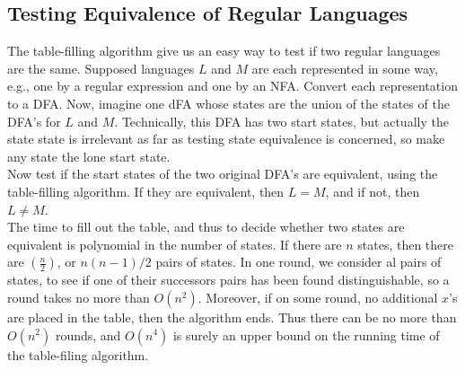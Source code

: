 \documentclass[]{article}
\begin{document}
  \subsection*{Testing Equivalence of Regular Languages}
    The table-filling algorithm give us an easy way to test if two regular
    languages are the same. Supposed languages $L$ and $M$ are each represented
    in some way, e.g., one by a regular expression and one by an NFA. Convert
    each representation to a DFA. Now, imagine one dFA whose states are the
    union of the states of the DFA's for $L$ and $M$. Technically, this DFA has
    two start states, but actually the state state is irrelevant as far as
    testing state equivalence is concerned, so make any state the lone start
    state. \\
    \indent Now test if the start states of the two original DFA's are
    equivalent, using the table-filling algorithm. If they are equivalent, then
    $L = M$, and if not, then $L \neq M$. \\
    \indent The time to fill out the table, and thus to decide whether two
    states are equivalent is polynomial in the number of states. If there are $n
    $ states, then there are $(\frac{n}{2})$, or $n(n-1)/2$ pairs of states. In
    one round, we consider al pairs of states, to see if one of their successors
    pairs has been found distinguishable, so a round takes no more than
    $O(n^2)$. Moreover, if on some round, no additional $x$'s are placed in the
    table, then the algorithm ends. Thus there can be no more than $O(n^2)$
    rounds, and $O(n^4)$ is surely an upper bound on the running time of the
    table-filing algorithm. \\
\end{document}
